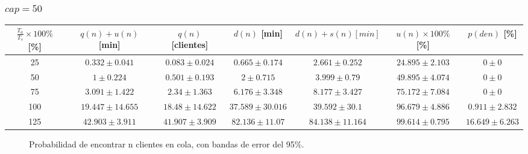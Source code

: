 \subsubsection[cap = 50]{$cap = 50$}

\begin{small}
  \begin{tabular}{||c||c|c|c|c|c|c||}
    \hline \hline
    $\frac{T_a}{T_s}\times100\%$ [\%] & $q(n)+u(n)$ [min] & $q(n)$ [clientes] & $d(n)$ [min] & $d(n)+s(n) [min]$ & $u(n)\times100\%$ [\%] & $p(den)$ [\%] \\
    \hline \hline
    25 & $0.332 \pm 0.041$ & $0.083 \pm 0.024$ & $0.665 \pm 0.174$ & $2.661 \pm 0.252$ & $24.895 \pm 2.103$ & $0 \pm 0$ \\
    \hline
    50 & $1 \pm 0.224$ & $0.501 \pm 0.193$ & $2 \pm 0.715$ & $3.999 \pm 0.79$ & $49.895 \pm 4.074$ & $0 \pm 0$ \\
    \hline
    75 & $3.091 \pm 1.422$ & $2.34 \pm 1.363$ & $6.176 \pm 3.348$ & $8.177 \pm 3.427$ & $75.172 \pm 7.084$ & $0 \pm 0$ \\
    \hline
    100 & $19.447 \pm 14.655$ & $18.48 \pm 14.622$ & $37.589 \pm 30.016$ & $39.592 \pm 30.1$ & $96.679 \pm 4.886$ & $0.911 \pm 2.832$ \\
    \hline
    125 & $42.903 \pm 3.911$ & $41.907 \pm 3.909$ & $82.136 \pm 11.07$ & $84.138 \pm 11.164$ & $99.614 \pm 0.795$ & $16.649 \pm 6.263$ \\
    \hline \hline
  \end{tabular}
\end{small}

\begin{figure}[H]
  \centering
  \begin{subfigure}{0.267\linewidth}
  \end{subfigure}\hspace{0.35cm}
  \begin{subfigure}{0.267\linewidth}
  \end{subfigure}\hspace{0.35cm}
  \begin{subfigure}{0.267\linewidth}
  \end{subfigure}
  \begin{subfigure}{0.267\linewidth}
  \end{subfigure}\hspace{0.35cm}
  \begin{subfigure}{0.267\linewidth}
  \end{subfigure}
  \caption{Probabilidad de encontrar n clientes en cola, con bandas de error del 95\%.}
\end{figure}

